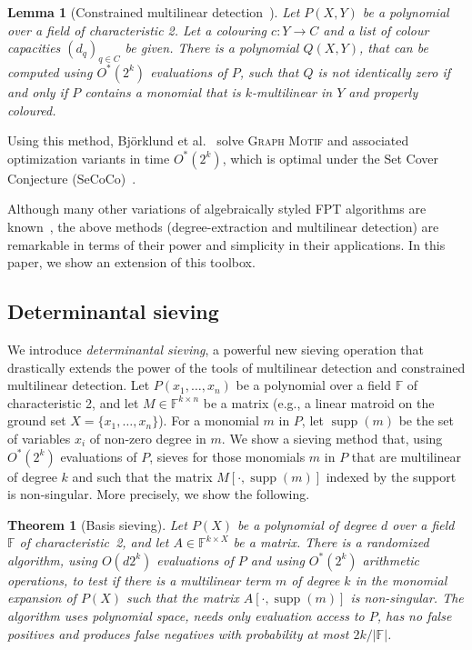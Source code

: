 \documentclass[10pt,a4paper]{article}
\newtheorem{theorem}{Theorem}[section]
\newtheorem{lemma}{Lemma}[section]
\newcommand{\F}{\ensuremath{\mathbb F}\xspace}
\DeclareMathOperator{\supp}{supp}
\begin{document}
\begin{lemma}[Constrained multilinear detection~\cite{BjorklundKK16}]
  Let $P(X,Y)$ be a polynomial 
  over a field of characteristic 2. Let a colouring $c \colon Y \to C$
  and a list of colour capacities $(d_q)_{q \in C}$ be given.  
  There is a polynomial $Q(X,Y)$,
  that can be computed using $O^*(2^k)$ evaluations of $P$, such that $Q$
  is not identically zero if and only if $P$ contains a monomial that
  is $k$-multilinear in $Y$ and properly coloured. 
\end{lemma}

Using this method, Bj\"orklund et al.~\cite{BjorklundKK16} solve
\textsc{Graph Motif} and associated optimization variants
in time $O^*(2^k)$, which is optimal under the Set Cover Conjecture
(SeCoCo)~\cite{BjorklundKK16,CyganDLMNOPSW16seth}.

Although many other variations of algebraically styled FPT algorithms
are known~\cite{BjorklundHKK07convolution,BrandDH18,Brand19thesis,BrandP21,CyganNPPRW22twdconn,FominLPS16JACM},
the above methods (degree-extraction and multilinear detection)
are remarkable in terms of their power and simplicity in their applications.
In this paper, we show an extension of this toolbox. 

\subsection{Determinantal sieving}

We introduce \emph{determinantal sieving}, a powerful new sieving
operation that drastically extends the power of the tools of
multilinear detection and constrained multilinear detection.
Let $P(x_1,\ldots,x_n)$ be a polynomial over a field $\F$ of
characteristic 2, and let $M \in \F^{k \times n}$ be a matrix (e.g., a
linear matroid on the ground set $X=\{x_1,\ldots,x_n\}$). 
For a monomial $m$ in $P$, let $\supp(m)$ be the set of variables $x_i$
of non-zero degree in $m$.
We show a sieving method that, using $O^*(2^k)$ evaluations of $P$,
sieves for those monomials $m$ in $P$ that are multilinear of degree $k$ 
and such that the matrix $M[\cdot,\supp(m)]$ indexed by the support 
is non-singular. More precisely, we show the following.

\begin{theorem}[Basis sieving] \label{ithm:simple}
  Let $P(X)$
  be a polynomial of degree $d$ over a field $\F$ of characteristic~2, 
  and let $A \in \F^{k \times X}$ be a
  matrix. There is a randomized algorithm,
  using $O(d2^k)$ evaluations of $P$ and using $O^*(2^k)$ arithmetic operations, to test if there is a multilinear
  term $m$ of degree $k$ in the monomial expansion of $P(X)$ such that the matrix
  $A[\cdot,\supp(m)]$ is non-singular.
  The algorithm uses polynomial space, needs only evaluation access to $P$,
  has no false positives and produces false negatives with probability
  at most $2k/|\F|$. 
\end{theorem}
\end{document}
